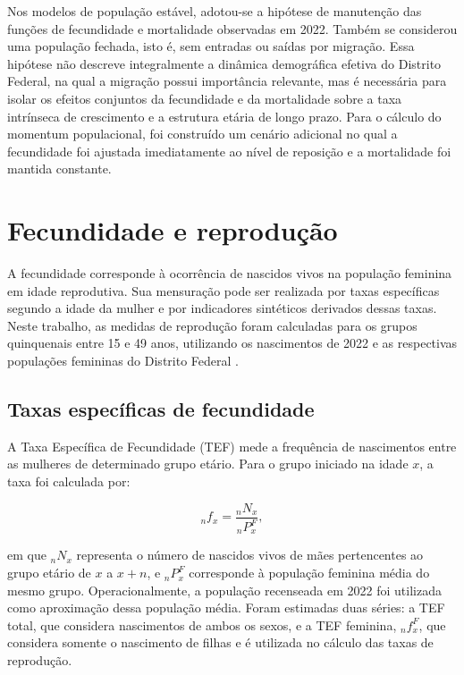\documentclass[a4paper,12pt]{article}
\begin{document}
Nos modelos de população estável, adotou-se a hipótese de manutenção das funções de fecundidade e mortalidade observadas em 2022. Também se considerou uma população fechada, isto é, sem entradas ou saídas por migração. Essa hipótese não descreve integralmente a dinâmica demográfica efetiva do Distrito Federal, na qual a migração possui importância relevante, mas é necessária para isolar os efeitos conjuntos da fecundidade e da mortalidade sobre a taxa intrínseca de crescimento e a estrutura etária de longo prazo. Para o cálculo do momentum populacional, foi construído um cenário adicional no qual a fecundidade foi ajustada imediatamente ao nível de reposição e a mortalidade foi mantida constante.


\section{Fecundidade e reprodução}

A fecundidade corresponde à ocorrência de nascidos vivos na população feminina em idade reprodutiva. Sua mensuração pode ser realizada por taxas específicas segundo a idade da mulher e por indicadores sintéticos derivados dessas taxas. Neste trabalho, as medidas de reprodução foram calculadas para os grupos quinquenais entre 15 e 49 anos, utilizando os nascimentos de 2022 e as respectivas populações femininas do Distrito Federal \cite{grupofoz2021}.

\subsection{Taxas específicas de fecundidade}

A Taxa Específica de Fecundidade (TEF) mede a frequência de nascimentos entre as mulheres de determinado grupo etário. Para o grupo iniciado na idade \(x\), a taxa foi calculada por:

\begin{equation}
{}_nf_x = \frac{{}_nN_x}{{}_nP_x^F},
\end{equation}

\noindent em que \({}_nN_x\) representa o número de nascidos vivos de mães pertencentes ao grupo etário de \(x\) a \(x+n\), e \({}_nP_x^F\) corresponde à população feminina média do mesmo grupo. Operacionalmente, a população recenseada em 2022 foi utilizada como aproximação dessa população média. Foram estimadas duas séries: a TEF total, que considera nascimentos de ambos os sexos, e a TEF feminina, \({}_nf_x^F\), que considera somente o nascimento de filhas e é utilizada no cálculo das taxas de reprodução.
\end{document}
